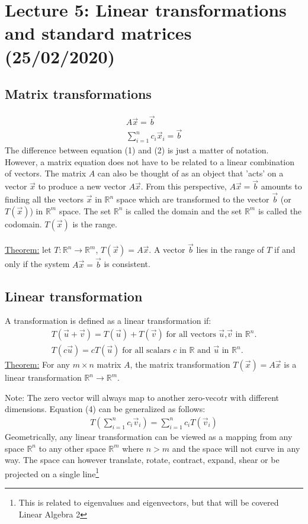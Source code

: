 \documentclass[11pt, a4paper]{article}
\begin{document}
\setcounter{section}{4}

\section{Lecture 5: Linear transformations and standard matrices (25/02/2020)}
\subsection{Matrix transformations}
\begin{gather}
  A\vec{x} = \vec{b}\\
  \sum_{i=1}^{n} c_i\vec{x}_i = \vec{b}
\end{gather}
The difference between equation (1) and (2) is just a matter of notation. However,
a matrix equation does not have to be related to a linear combination of vectors. The
matrix $A$ can also be thought of as an object that 'acts' on a vector $\vec{x}$ to produce
a new vector $A\vec{x}$. From this perspective, $A\vec{x} = \vec{b}$ amounts to finding all the
vectors $\vec{x}$ in $\mathbb{R}^n$ space which are transformed to the vector $\vec{b}$ (or $T(\vec{x})$)
in $\mathbb{R}^m$ space. The set $\mathbb{R}^n$ is called the domain and the set $\mathbb{R}^m$ is called the codomain.
$T(\vec{x})$ is the range.\\
\\
\underline{Theorem:}
let $T: \mathbb{R}^n \rightarrow \mathbb{R}^m$, $T(\vec{x}) = A\vec{x}$. A vector $\vec{b}$ lies in the range
of $T$ if and only if the system $A\vec{x} = \vec{b}$ is consistent.

\subsection{Linear transformation}
A transformation is defined as a linear transformation if:
\begin{gather}
  T(\vec{u} + \vec{v}) = T(\vec{u}) + T(\vec{v}) \;\text{for all vectors $\vec{u}$,$\vec{v}$ in $\mathbb{R}^n$.}\\
  T(c\vec{u}) = cT(\vec{u}) \; \text{for all scalars $c$ in $\mathbb{R}$ and $\vec{u}$ in $\mathbb{R}^n$.}
\end{gather}
\underline{Theorem:}
For any $m \times n$ matrix $A$, the matrix transformation $T(\vec{x}) = A\vec{x}$ is a 
linear transformation $\mathbb{R}^n \rightarrow \mathbb{R}^m$.

Note: The zero vector will always map to another zero-vecotr with different dimensions.
Equation (4) can be generalized as follows:
\begin{gather}
  T(\sum_{i=1}^{n} c_i\vec{v}_i) = \sum_{i=1}^{n} c_iT(\vec{v}_i)
\end{gather}
Geometrically, any linear transformation can be viewed as a mapping from any space $\mathbb{R}^n$ to any other space $\mathbb{R}^m$
where $n > m$ and the space will not curve in any way. The space can however translate, rotate, contract, expand, shear or be 
projected on a single line\footnote{This is related to eigenvalues and eigenvectors, but that will be covered Linear Algebra 2}
\end{document}
